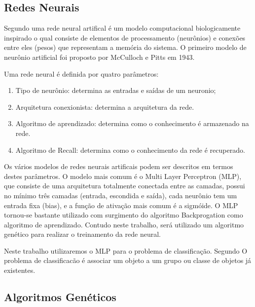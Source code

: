 \documentclass[12pt]{article}
\begin{document}
\subsection{Redes Neurais}

\par Segundo \cite{kasabov} uma rede neural artifical é um modelo computacional biologicamente inspirado o qual consiste de elementos de processamento (neurônios) e conexões entre eles (pesos) que representam a memória do sistema. O primeiro modelo de neurônio artificial foi proposto por McCulloch e Pitts em 1943. 
\par Uma rede neural é definida por quatro parâmetros:

\begin{enumerate}
	\item Tipo de neurônio: determina as entradas e saídas de um neuronio;
	\item Arquitetura conexionista: determina a arquitetura da rede.
	\item Algoritmo de aprendizado: determina como o conhecimento é armazenado na rede.
	\item Algoritmo de Recall: determina como o conhecimento da rede é recuperado.
\end{enumerate}

\par Os vários modelos de redes neurais artificais podem ser descritos em termos destes parâmetros. O modelo mais comum é o Multi Layer Perceptron (MLP), que consiste de uma arquitetura totalmente conectada entre as camadas, possui no mínimo três camadas (entrada, escondida e saída), cada neurônio tem um entrada fixa (bias), e a função de ativação mais comum é a sigmóide. O MLP tornou-se bastante utilizado com surgimento do algoritmo Backprogation como algoritmo de aprendizado. Contudo neste trabalho, será utilizado um algoritmo genético para realizar o treinamento da rede neural.

\par Neste trabalho utilizaremos o MLP para o problema de classificação. Segundo \cite{kasabov} O problema de classificacão é associar um objeto a um grupo ou classe de objetos já existentes. 

\subsection{Algoritmos Genéticos}
\end{document}

